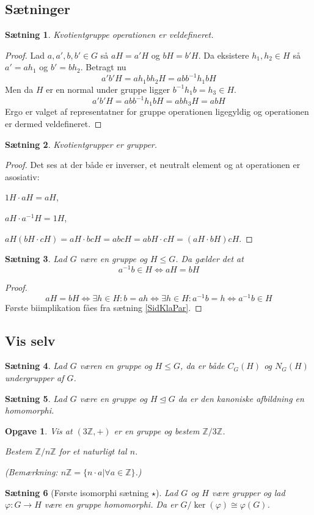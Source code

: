 \documentclass{article}
\newcommand{\Z}{\mathbb{Z}}
\newcommand{\inv}{^{-1}}
\newcommand{\biimp}{\Leftrightarrow}
\newcommand{\too}{\rightarrow}
\newtheorem{opg}{Opgave}
\newtheorem{setn}{Sætning}
\begin{document}
		\subsection*{Sætninger}
		\begin{setn}
			Kvotientgruppe operationen er veldefineret.
		\end{setn}
		\begin{proof}
			Lad $a,a',b,b' \in G$ så $aH = a'H$ og $bH = b'H$. Da eksistere $h_1, h_2 \in H$
			så $a' = ah_1$ og $b' = bh_2$. Betragt nu
			$$a'b'H = ah_1bh_2H = abb\inv h_1bH$$
			Men da $H$ er en normal under gruppe ligger $b\inv h_1 b = h_3 \in H$.
			$$a'b'H = abb\inv h_1bH = abh_3H = abH$$
			Ergo er valget af representatner for gruppe operationen ligegyldig og operationen
			er dermed veldefineret.
		\end{proof}
		\begin{setn}
			Kvotientgrupper er grupper.
		\end{setn}
		\begin{proof}
			Det ses at der både er inverser, et neutralt element og at operationen er asosiativ:

			$1H\cdot aH = aH$,

			$aH\cdot a\inv H = 1H$,

			$aH(bH\cdot cH) = aH \cdot bcH = abcH = abH \cdot cH = (aH\cdot bH)cH$.
		\end{proof}
		\begin{setn} \label{SidKlaKrav}
			Lad $G$ være en gruppe og $H \le G$. Da gælder det at 
			$$a\inv b \in H \biimp aH = bH$$
		\end{setn}
		\begin{proof}
			$$aH = bH \biimp \exists h \in H: b = ah \biimp \exists h \in H: a\inv b = h \biimp
			a\inv b \in H$$
			Første biimplikation fåes fra sætning \ref{SidKlaPar}.
		\end{proof}
		\subsection*{Vis selv}
		\begin{setn}
			Lad $G$ væren en gruppe og $H \le G$, da er både $C_G(H)$ og $N_G(H)$ undergrupper
			af $G$.
		\end{setn}
		\begin{setn}
			Lad $G$ være en gruppe og $H \unlhd G$ da er
			den kanoniske afbildning en homomorphi.
		\end{setn}
		\begin{opg}
			Vis at $(3\Z,+)$ er en gruppe og bestem $\Z/3\Z$.

			Bestem $\Z/n\Z$ for et naturligt tal $n$.

			(Bemærkning: $n\Z = \{n\cdot a| \forall a \in \Z\}$.)
		\end{opg}
		\begin{setn}[Første isomorphi sætning $\star$] \label{Iso1}
			Lad $G$ og $H$ være grupper og lad $\varphi: G \too H$ være en gruppe homomorphi.
			Da er $G/\ker(\varphi) \cong \varphi(G)$.
		\end{setn}
	\newpage
\end{document}

